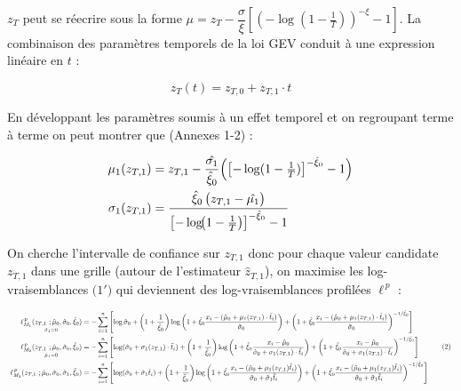 \documentclass[
  article,
  nofooter,
  noheadings]{jss}
\begin{document}
\(z_T\) peut se réecrire sous la forme
\(\mu = z_T - \dfrac{\sigma}{\xi} \left[ \left( -\log\left(1 - \frac{1}{T} \right) \right)^{-\xi} - 1 \right]\).
La combinaison des paramètres temporels de la loi GEV conduit à une
expression linéaire en \(t\) :

\[
z_T(t) = z_{T,0} + z_{T,1} \cdot t
\]

En développant les paramètres soumis à un effet temporel et on
regroupant terme à terme on peut montrer que (Annexes 1-2) :

\[
\begin{aligned}
\mu_1(z_{T,1}) &= z_{T,1} -\dfrac{\hat{\sigma_1}}{\hat{\xi}_0}\Bigl(\bigl[-\log(1-\tfrac1T)\bigr]^{-\hat{\xi}_0}-1\Bigr)\\
\sigma_1(z_{T,1}) &= \dfrac{\hat{\xi}_0\,\bigl(z_{T,1}-\hat{\mu_1}\bigr)}{\bigl[-\log\!\bigl(1-\tfrac1T\bigr)\bigr]^{-\hat{\xi}_0}-1}\\
\end{aligned}
\]

On cherche l'intervalle de confiance sur \(z_{T,1}\) donc pour chaque
valeur candidate \(z_{T,1}\) dans une grille (autour de l'estimateur
\(\hat{z}_{T,1}\)), on maximise les log-vraisemblances
\textbf{\(\text{(1$'$)}\)} qui deviennent des log-vraisemblances
profilées \(\ell^{\,p}\) :

\[
\scalebox{0.7}{
\(
\begin{aligned}
\underset{\hat{\sigma}_1 = 0}{\ell_{M_1}^{\,p}(z_{T,1} \ ; \hat{\mu}_0, \hat{\sigma}_0, \hat{\xi}_0)} &= 
-\sum_{i=1}^n \left[
\log \hat{\sigma}_0 +
\left(1 + \frac{1}{\hat{\xi}_0} \right) \log \left(1 + \hat{\xi}_0 \frac{x_i - (\hat{\mu}_0 + \mu_1(z_{T,1}) \cdot \tilde{t}_i)}{\hat{\sigma}_0} \right) +
\left(1 + \hat{\xi}_0 \frac{x_i - (\hat{\mu}_0 + \mu_1(z_{T,1}) \cdot \tilde{t}_i)}{\hat{\sigma}_0} \right)^{-1/\hat{\xi}_0}
\right]\\
\underset{\hat{\mu}_1 = 0}{\ell_{M_2}^{\,p}(z_{T,1} \ ; \hat{\mu}_0, \hat{\sigma}_0, \hat{\xi}_0)} &= 
-\sum_{i=1}^n \left[
\log (\hat{\sigma}_0 + \sigma_1(z_{T,1}) \cdot \tilde{t}_i) +
\left(1 + \frac{1}{\hat{\xi}_0} \right) \log \left(1 + \hat{\xi}_0 \frac{x_i - \hat{\mu}_0}{\hat{\sigma}_0 + \sigma_1(z_{T,1}) \cdot \tilde{t}_i} \right) +
\left(1 + \hat{\xi}_0 \frac{x_i - \hat{\mu}_0}{\hat{\sigma}_0 + \sigma_1(z_{T,1}) \cdot \tilde{t}_i} \right)^{-1/\hat{\xi}_0}
\right]\\
\ell_{M_3}^{\,p}(z_{T,1} \ ; \hat{\mu}_0, \hat{\sigma}_0, \hat{\sigma}_1, \hat{\xi}_0) &= 
-\sum_{i=1}^n \left[
\log (\hat{\sigma}_0 + \hat{\sigma}_1 \tilde{t}_i) +
\left(1 + \frac{1}{\hat{\xi}_0} \right) \log \left(1 + \hat{\xi}_0 \frac{x_i - (\hat{\mu}_0 + \mu_1(z_{T,1}) \tilde{t}_i)}{\hat{\sigma}_0 + \hat{\sigma}_1 \tilde{t}_i} \right) +
\left(1 + \hat{\xi}_0 \frac{x_i - (\hat{\mu}_0 + \mu_1(z_{T,1}) \tilde{t}_i)}{\hat{\sigma}_0 + \hat{\sigma}_1 \tilde{t}_i} \right)^{-1/\hat{\xi}_0}
\right]\\
\end{aligned}
\tag{2}
\)
}
\]
\end{document}
